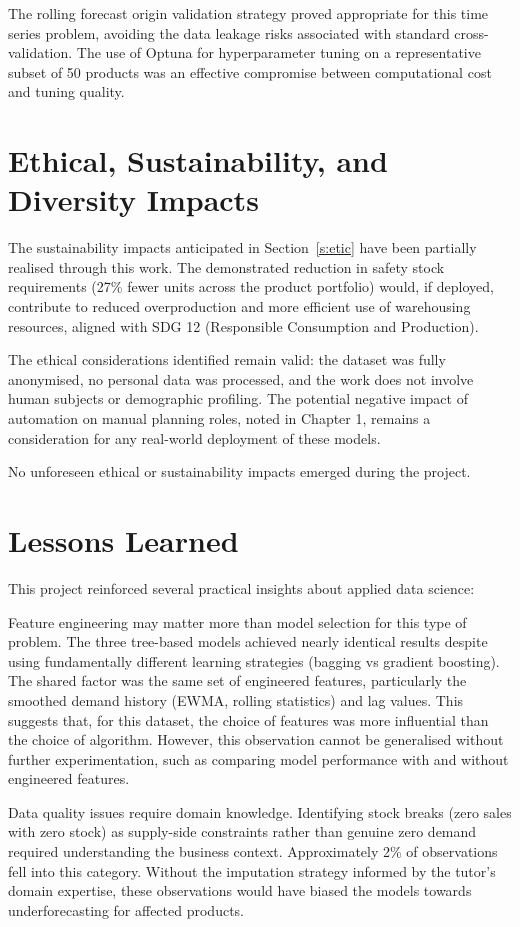 The rolling forecast origin validation strategy proved appropriate for this time series problem, avoiding the data leakage risks associated with standard cross-validation. The use of Optuna for hyperparameter tuning on a representative subset of 50 products was an effective compromise between computational cost and tuning quality.

\section{Ethical, Sustainability, and Diversity Impacts}

The sustainability impacts anticipated in Section~\ref{s:etic} have been partially realised through this work. The demonstrated reduction in safety stock requirements (27\% fewer units across the product portfolio) would, if deployed, contribute to reduced overproduction and more efficient use of warehousing resources, aligned with SDG 12 (Responsible Consumption and Production).

The ethical considerations identified remain valid: the dataset was fully anonymised, no personal data was processed, and the work does not involve human subjects or demographic profiling. The potential negative impact of automation on manual planning roles, noted in Chapter 1, remains a consideration for any real-world deployment of these models.

No unforeseen ethical or sustainability impacts emerged during the project.

\section{Lessons Learned}

This project reinforced several practical insights about applied data science:

Feature engineering may matter more than model selection for this type of problem. The three tree-based models achieved nearly identical results despite using fundamentally different learning strategies (bagging vs gradient boosting). The shared factor was the same set of engineered features, particularly the smoothed demand history (EWMA, rolling statistics) and lag values. This suggests that, for this dataset, the choice of features was more influential than the choice of algorithm. However, this observation cannot be generalised without further experimentation, such as comparing model performance with and without engineered features.

Data quality issues require domain knowledge. Identifying stock breaks (zero sales with zero stock) as supply-side constraints rather than genuine zero demand required understanding the business context. Approximately 2\% of observations fell into this category. Without the imputation strategy informed by the tutor's domain expertise, these observations would have biased the models towards underforecasting for affected products.

